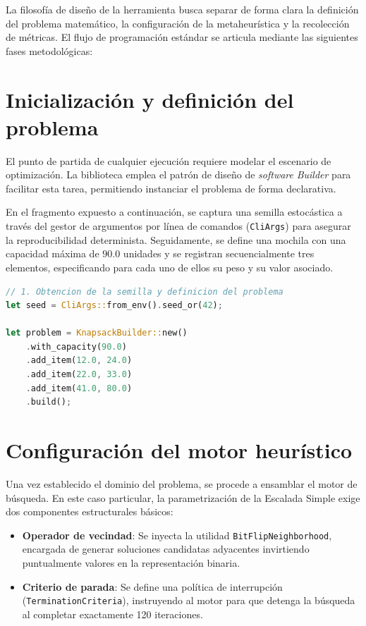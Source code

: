 \documentclass[12pt,a4paper,twoside,openright]{book}
\begin{document}
\begin{umaappendices}
La filosofía de diseño de la herramienta busca separar de forma clara la definición del problema matemático, la configuración de la metaheurística y la recolección de métricas. El flujo de programación estándar se articula mediante las siguientes fases metodológicas:

\section{Inicialización y definición del problema}
El punto de partida de cualquier ejecución requiere modelar el escenario de optimización. La biblioteca emplea el patrón de diseño de \textit{software} \textit{Builder} para facilitar esta tarea, permitiendo instanciar el problema de forma declarativa. 

En el fragmento expuesto a continuación, se captura una semilla estocástica a través del gestor de argumentos por línea de comandos (\texttt{CliArgs}) para asegurar la reproducibilidad determinista. Seguidamente, se define una mochila con una capacidad máxima de $90.0$ unidades y se registran secuencialmente tres elementos, especificando para cada uno de ellos su peso y su valor asociado.

\begin{lstlisting}[language=Rust, caption={Captura de semilla y construcción del problema de la mochila.}]
// 1. Obtencion de la semilla y definicion del problema
let seed = CliArgs::from_env().seed_or(42);

let problem = KnapsackBuilder::new()
    .with_capacity(90.0)
    .add_item(12.0, 24.0)
    .add_item(22.0, 33.0)
    .add_item(41.0, 80.0)
    .build();
\end{lstlisting}

\section{Configuración del motor heurístico}
Una vez establecido el dominio del problema, se procede a ensamblar el motor de búsqueda. En este caso particular, la parametrización de la Escalada Simple exige dos componentes estructurales básicos:
\begin{itemize}
    \item \textbf{Operador de vecindad}: Se inyecta la utilidad \texttt{BitFlipNeighborhood}, encargada de generar soluciones candidatas adyacentes invirtiendo puntualmente valores en la representación binaria.
    \item \textbf{Criterio de parada}: Se define una política de interrupción (\texttt{TerminationCriteria}), instruyendo al motor para que detenga la búsqueda al completar exactamente 120 iteraciones.
\end{itemize}


\end{umaappendices}
\end{document}
